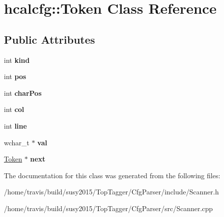 \hypertarget{classhcalcfg_1_1Token}{\section{hcalcfg\-:\-:Token Class Reference}
\label{classhcalcfg_1_1Token}
}
\subsection*{Public Attributes}
\begin{DoxyCompactItemize}
\item 
\hypertarget{classhcalcfg_1_1Token_a161bdce3a4fdcb6a8f60bea7a90f59a4}{int {\bfseries kind}}\label{classhcalcfg_1_1Token_a161bdce3a4fdcb6a8f60bea7a90f59a4}

\item 
\hypertarget{classhcalcfg_1_1Token_a887ce5f48551400f3f93995ea562626f}{int {\bfseries pos}}\label{classhcalcfg_1_1Token_a887ce5f48551400f3f93995ea562626f}

\item 
\hypertarget{classhcalcfg_1_1Token_acc25802f5d681ac4d13e6353e5fc927b}{int {\bfseries char\-Pos}}\label{classhcalcfg_1_1Token_acc25802f5d681ac4d13e6353e5fc927b}

\item 
\hypertarget{classhcalcfg_1_1Token_a6e212446af50850c1970486e45e9021d}{int {\bfseries col}}\label{classhcalcfg_1_1Token_a6e212446af50850c1970486e45e9021d}

\item 
\hypertarget{classhcalcfg_1_1Token_a830def96a4ec29f5a4c6f552f47df895}{int {\bfseries line}}\label{classhcalcfg_1_1Token_a830def96a4ec29f5a4c6f552f47df895}

\item 
\hypertarget{classhcalcfg_1_1Token_a4f020a9e2e62374cc23f4543d2f0d96d}{wchar\-\_\-t $\ast$ {\bfseries val}}\label{classhcalcfg_1_1Token_a4f020a9e2e62374cc23f4543d2f0d96d}

\item 
\hypertarget{classhcalcfg_1_1Token_af869066be56489268d6c6a0e427a28e1}{\hyperlink{classhcalcfg_1_1Token}{Token} $\ast$ {\bfseries next}}\label{classhcalcfg_1_1Token_af869066be56489268d6c6a0e427a28e1}

\end{DoxyCompactItemize}


The documentation for this class was generated from the following files\-:\begin{DoxyCompactItemize}
\item 
/home/travis/build/susy2015/\-Top\-Tagger/\-Cfg\-Parser/include/Scanner.\-h\item 
/home/travis/build/susy2015/\-Top\-Tagger/\-Cfg\-Parser/src/Scanner.\-cpp\end{DoxyCompactItemize}
